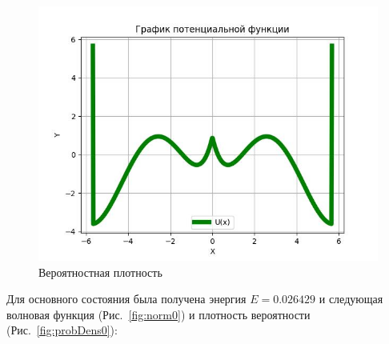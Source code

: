\documentclass[a4paper,12pt]{article}
\begin{document}
\begin{figure}[h]
\centering
    \includegraphics[width=0.45\linewidth]{Potential_func_graph}
    \caption{Вероятностная плотность}\label{fig:pot_func}
\end{figure}

Для основного состояния была получена энергия $E = 0.026429$ и следующая волновая функция (Рис.~\ref{fig:norm0}) и плотность вероятности (Рис.~\ref{fig:probDens0}):
\end{document}
